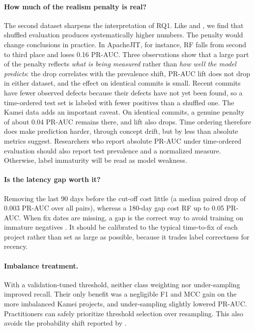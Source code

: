 \paragraph{How much of the realism penalty is real?} The second dataset sharpens the interpretation of RQ1. Like \citet{falessi2020} and \citet{song2023a}, we find that shuffled evaluation produces systematically higher numbers. The penalty would change conclusions in practice. In ApacheJIT, for instance, RF falls from second to third place and loses 0.16 PR-AUC. Three observations show that a large part of the penalty reflects \emph{what is being measured} rather than \emph{how well the model predicts}: the drop correlates with the prevalence shift, PR-AUC lift does not drop in either dataset, and the effect on identical commits is small. Recent commits have fewer observed defects because their defects have not yet been found, so a time-ordered test set is labeled with fewer positives than a shuffled one. The Kamei data adds an important caveat. On identical commits, a genuine penalty of about 0.04 PR-AUC remains there, and lift also drops. Time ordering therefore does make prediction harder, through concept drift, but by less than absolute metrics suggest. Researchers who report absolute PR-AUC under time-ordered evaluation should also report test prevalence and a normalized measure. Otherwise, label immaturity will be read as model weakness.

\paragraph{Is the latency gap worth it?} Removing the last 90 days before the cut-off cost little (a median paired drop of 0.003 PR-AUC over all pairs), whereas a 180-day gap cost RF up to 0.05 PR-AUC. When fix dates are missing, a gap is the correct way to avoid training on immature negatives \citep{cabral2019}. It should be calibrated to the typical time-to-fix of each project rather than set as large as possible, because it trades label correctness for recency.

\paragraph{Imbalance treatment.} With a validation-tuned threshold, neither class weighting nor under-sampling improved recall. Their only benefit was a negligible F1 and MCC gain on the more imbalanced Kamei projects, and under-sampling slightly lowered PR-AUC. Practitioners can safely prioritize threshold selection over resampling. This also avoids the probability shift reported by \citet{tantithamthavorn2020}.

